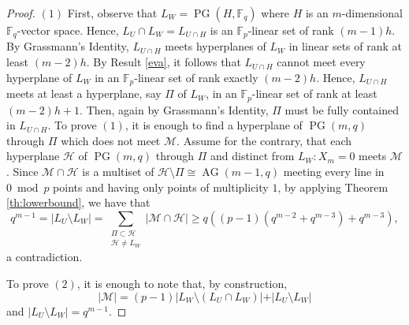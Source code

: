 \documentclass[12pt]{article}
\newcommand{\cM}{{\mathcal M}}
\newcommand{\cH}{{\mathcal H}}
\newcommand{\F}{{\mathbb F}}
\DeclareMathOperator{\PG}{{PG}}
\DeclareMathOperator{\AG}{{AG}}
\begin{document}
\begin{proof}
	$(1)$ First, observe that $L_W=\PG(H,\F_q)$ where $H$ is an $m$-dimensional $\F_q$-vector space. Hence,  $L_U \cap L_W=L_{U\cap H}$ is an $\F_p$-linear set of rank $(m-1)h$. By Grassmann's Identity, $L_{U\cap H}$ meets hyperplanes of $L_W$ in linear sets of rank at least $(m-2)h$. By Result \ref{eva}, it follows that $L_{U \cap H}$ cannot meet every hyperplane of $L_W$ in an $\F_p$-linear set of rank exactly $(m-2)h$. 
	Hence, $L_{U \cap H}$ meets at least a hyperplane, say $\Pi$ of $L_W$, in an $\F_p$-linear set of rank at least $(m-2)h+1$. Then, again by Grassmann's Identity, $\Pi$ must be fully contained in $L_{U\cap H}$. 
	To prove $(1)$, it is enough to find a hyperplane of $\PG(m,q)$ through $\Pi$ which does not meet $\cM$. Assume for the contrary, 
	that each hyperplane $\cH$ of $\PG(m,q)$ through $\Pi$ and distinct from $L_W \colon X_m=0$ meets $\cM$. Since $\cM \cap \cH$ is a multiset of $\cH \setminus \Pi \cong \AG(m-1,q)$ meeting every line in $0 \bmod p $ points and having only points of multiplicity $1$, by applying Theorem \ref{th:lowerbound}, we have that 
	$$q^{m-1}= \vert L_U \setminus L_W \vert = \sum_{\substack{\Pi \subset \cH \\ \cH \neq L_W}} |\cM \cap \cH|  \geq q ((p-1)(q^{m-2}+q^{m-3})+q^{m-3}),$$
	a contradiction.
	
	To prove $(2)$, it is enough to note that, by construction, 
	$$|\cM|= (p-1)\vert L_W \setminus (L_{U} \cap L_{W}) \vert + \vert L_U \setminus L_W \vert $$
	and  $|L_U \setminus L_W|= q^{m-1}$.
\end{proof}
\end{document}
